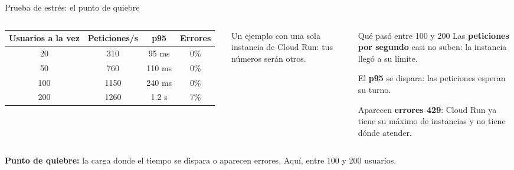 \documentclass[aspectratio=169,10pt,c]{beamer}
\begin{document}
\begin{frame}{Prueba de estrés: el punto de quiebre}
\begin{columns}[T,onlytextwidth]
\renewcommand{\arraystretch}{1.3}
\small
\setlength{\tabcolsep}{4pt}
\begin{tabular}{@{}cccc@{}}
\toprule
\textbf{Usuarios a la vez} & \textbf{Peticiones/s} & \textbf{p95} & \textbf{Errores}\\
\midrule
20 & 310 & 95 ms & 0\%\\
50 & 760 & 110 ms & 0\%\\
100 & 1150 & 240 ms & 0\%\\
\rowcolor{utpRojo!15} 200 & 1260 & 1.2 s & 7\%\\
\bottomrule
\end{tabular}
\vspace{2mm}

{\scriptsize Un ejemplo con una sola instancia de Cloud Run: tus números serán otros.}
\begin{block}{Qué pasó entre 100 y 200}
\small Las \textbf{peticiones por segundo} casi no suben: la instancia llegó a su límite.\par\smallskip
El \textbf{p95} se dispara: las peticiones esperan su turno.\par\smallskip
Aparecen \textbf{errores 429}: Cloud Run ya tiene su máximo de instancias y no tiene dónde atender.
\end{block}
\end{columns}
\vspace{4mm}
\begin{center}
\colorbox{utpGrisClaro}{\parbox{.85\textwidth}{\centering\small \textbf{Punto de quiebre:} la carga donde el tiempo se dispara o aparecen errores. Aquí, entre 100 y 200 usuarios.}}
\end{center}
\end{frame}
\end{document}
